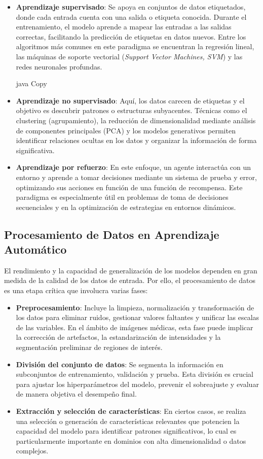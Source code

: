 \documentclass[11pt,spanish,listoffigures,listoftables]{tfgetsinf}
\begin{document}
\begin{itemize} \item \textbf{Aprendizaje supervisado}: Se apoya en conjuntos de datos etiquetados, donde cada entrada cuenta con una salida o etiqueta conocida. Durante el entrenamiento, el modelo aprende a mapear las entradas a las salidas correctas, facilitando la predicción de etiquetas en datos nuevos. Entre los algoritmos más comunes en este paradigma se encuentran la regresión lineal, las máquinas de soporte vectorial (\textit{Support Vector Machines, SVM}) y las redes neuronales profundas.

java
Copy
\item \textbf{Aprendizaje no supervisado}: Aquí, los datos carecen de etiquetas y el objetivo es descubrir patrones o estructuras subyacentes. Técnicas como el clustering (agrupamiento), la reducción de dimensionalidad mediante análisis de componentes principales (PCA) y los modelos generativos permiten identificar relaciones ocultas en los datos y organizar la información de forma significativa.

\item \textbf{Aprendizaje por refuerzo}: En este enfoque, un agente interactúa con un entorno y aprende a tomar decisiones mediante un sistema de prueba y error, optimizando sus acciones en función de una función de recompensa. Este paradigma es especialmente útil en problemas de toma de decisiones secuenciales y en la optimización de estrategias en entornos dinámicos.
\end{itemize}

\subsection{Procesamiento de Datos en Aprendizaje Automático}

El rendimiento y la capacidad de generalización de los modelos dependen en gran medida de la calidad de los datos de entrada. Por ello, el procesamiento de datos es una etapa crítica que involucra varias fases:

\begin{itemize} \item \textbf{Preprocesamiento}: Incluye la limpieza, normalización y transformación de los datos para eliminar ruidos, gestionar valores faltantes y unificar las escalas de las variables. En el ámbito de imágenes médicas, esta fase puede implicar la corrección de artefactos, la estandarización de intensidades y la segmentación preliminar de regiones de interés. \item \textbf{División del conjunto de datos}: Se segmenta la información en subconjuntos de entrenamiento, validación y prueba. Esta división es crucial para ajustar los hiperparámetros del modelo, prevenir el sobreajuste y evaluar de manera objetiva el desempeño final. \item \textbf{Extracción y selección de características}: En ciertos casos, se realiza una selección o generación de características relevantes que potencien la capacidad del modelo para identificar patrones significativos, lo cual es particularmente importante en dominios con alta dimensionalidad o datos complejos. \end{itemize}
\end{document}
